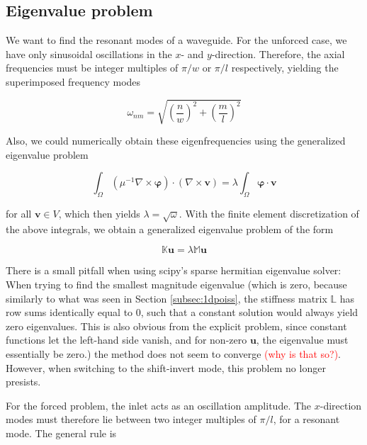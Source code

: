 \documentclass[11pt, a4paper]{article}
\begin{document}
\subsection{Eigenvalue problem}
\label{subsec:evp}

We want to find the resonant modes of a waveguide. For the unforced case,
we have only sinusoidal oscillations in the $x$- and $y$-direction. Therefore,
the axial frequencies must be integer multiples of $\pi/w$ or $\pi/l$ respectively,
yielding the superimposed frequency modes

\begin{equation}
    \omega_{nm} = \sqrt{\left(\frac{n}{w}\right)^2 + \left(\frac{m}{l}\right)^2}
\end{equation}

Also, we could numerically obtain these eigenfrequencies using the generalized
eigenvalue problem

\begin{equation}
    \int_{\Omega} (\mu^{-1} \nabla \times \boldsymbol{\varphi}) \cdot (\nabla \times \mathbf{v})
    = \lambda \int_{\Omega} \boldsymbol{\varphi} \cdot \mathbf{v}
\end{equation}

for all $\mathbf{v} \in V$, which then yields $\lambda = \sqrt{\omega}$.
With the finite element discretization of the above integrals, we obtain a
generalized eigenvalue problem of the form

\begin{equation}
    \mathbb{K} \mathbf{u} = \lambda \mathbb{M} \mathbf{u}
\end{equation}

There is a small pitfall when using scipy's sparse hermitian eigenvalue solver:
When trying to find the smallest magnitude eigenvalue (which is zero, because
similarly to what was seen in Section \ref{subsec:1dpoiss}, the stiffness matrix
$\mathbb{L}$ has row sums identically equal to 0, such that a constant solution 
would always yield zero eigenvalues. This is also obvious from the explicit problem,
since constant functions let the left-hand side vanish, and for non-zero 
$\mathbf{u}$, the eigenvalue must essentially be zero.)
the method does not seem
to converge \textcolor{red}{(why is that so?)}. However, when switching to the 
shift-invert mode, this problem no longer presists.

For the forced problem, the inlet acts as an oscillation amplitude. The $x$-direction 
modes must therefore lie between two integer multiples of $\pi/l$, for a resonant 
mode. The general rule is 
\end{document}
